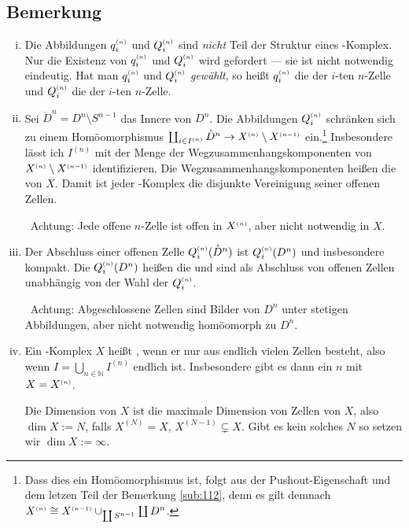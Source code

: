 \subsection[Bemerkungen zur Definition von \CW-Komplexen]{Bemerkung} %
\label{sub:114}
\begin{enumerate}[(i)]
	\item Die Abbildungen $q_i^{\scriptscriptstyle(n)}$ und $Q_i^{\scriptscriptstyle(n)}$ sind \emph{nicht} Teil der Struktur eines \CW-Komplex. Nur die Existenz von $q_i^{\scriptscriptstyle(n)}$ und $Q_i^{\scriptscriptstyle(n)}$ wird 
	gefordert --- sie ist nicht notwendig eindeutig. Hat man $q_i^{\scriptscriptstyle(n)}$ und $Q_i^{\scriptscriptstyle(n)}$ \emph{gewählt}, so heißt $q_i^{\scriptscriptstyle(n)}$ die  der $i$-ten
	$n$-Zelle und $Q_i^{\scriptscriptstyle(n)}$ die  der $i$-ten $n$-Zelle.
	\item Sei $\mathring{D}^n = D^n \setminus S^{n-1}$ das Innere von $D^n$. Die Abbildungen $Q_i^{\scriptscriptstyle(n)}$ schränken sich zu einem Homöomorphismus 
	$\coprod_{i \in I^{(n)}} \mathring{D}^n \to X^{\scriptscriptstyle(n)} \setminus X^{\scriptscriptstyle(n-1)}$ ein.\footnote{Dass dies ein Homöomorphismus ist, folgt 
	aus der Pushout-Eigenschaft und dem letzen Teil der Bemerkung \ref{sub:112}, denn es gilt demnach 
	$X^{\scriptscriptstyle(n)}\cong X^{\scriptscriptstyle(n-1)}\cup_{\coprod S^{n-1}} \coprod D^n$.} 
	Insbesondere lässt ich $I^{(n)}$ mit der Menge der Wegzusammenhangskomponenten von 
	$X^{\scriptscriptstyle(n)} \setminus X^{\scriptscriptstyle(n-1)}$ identifizieren. Die Wegzusammenhangskomponenten heißen die  von $X$. Damit ist jeder \CW-Komplex 
	die disjunkte Vereinigung seiner offenen Zellen.
	
	\ifxetexorluatex \faWarningSign \, \fi Achtung: Jede offene $n$-Zelle ist offen in $X^{\scriptscriptstyle(n)}$, aber nicht notwendig in $X$.
	\item Der Abschluss einer offenen Zelle $Q_i^{\scriptscriptstyle(n)}(\mathring{D}^n)$ ist $Q_i^{\scriptscriptstyle(n)}(D^n)$ und insbesondere kompakt. Die $Q_i^{\scriptscriptstyle(n)}(D^n)$ heißen die
	 und sind als Abschluss von offenen Zellen unabhängig von der Wahl der $Q_i^{\scriptscriptstyle(n)}$.
	
	\ifxetexorluatex \faWarningSign \, \fi Achtung: Abgeschlossene Zellen sind Bilder von $D^n$ unter stetigen Abbildungen, aber nicht notwendig homöomorph zu $D^n$.
	\item Ein \CW-Komplex $X$ heißt , wenn er nur aus endlich vielen Zellen besteht, also wenn 
	$I = \bigcup_{n \in \mathds{N} } I^{(n)}$ endlich ist. Insbesondere gibt es dann ein $n$ mit $X=X^{\scriptscriptstyle(n)}$.
	
	Die Dimension von $X$ ist die maximale Dimension von Zellen von $X$, also $\dim X := N$, falls $X^{(N)}=X$, $X^{(N-1)} \subsetneq X$. Gibt es kein solches $N$ so 
	setzen wir $\dim X := \infty$.
\end{enumerate}


